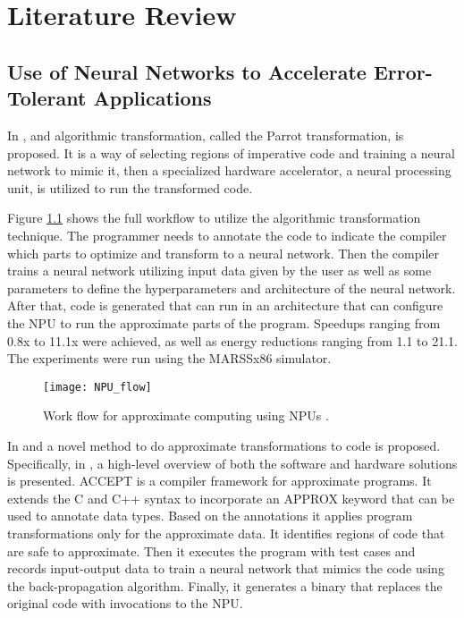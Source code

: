 \chapter{Literature Review}
\label{ch:review}

\section{Use of Neural Networks to Accelerate Error-\\Tolerant Applications}

In \cite{Esmaeilzadeh2012}, and algorithmic transformation, called the Parrot transformation, is proposed. It is a way of selecting regions of imperative code and training a neural network to mimic it, then a specialized hardware accelerator, a neural processing unit, is utilized to run the transformed code.

Figure \ref{fig:NPU_flow} shows the full workflow to utilize the algorithmic transformation technique. The programmer needs to annotate the code to indicate the compiler which parts to optimize and transform to a neural network. Then the compiler trains a neural network utilizing input data given by the user as well as some parameters to define the hyperparameters and architecture of the neural network. After that, code is generated that can run in an architecture that can configure the NPU to run the approximate parts of the program. Speedups ranging from 0.8x to 11.1x were achieved, as well as energy reductions ranging from 1.1 to 21.1. The experiments were run using the MARSSx86 simulator.

\begin{figure}[thbp]
	\centering
	\texttt{[image: NPU\_flow]}
	\caption{Work flow for approximate computing using NPUs \cite{Esmaeilzadeh2012}.}
	\label{fig:NPU_flow}
\end{figure}

In \cite{Moreau2015a} and \cite{Moreau2015} a novel method to do approximate transformations to code is proposed. Specifically, in \cite{Moreau2015a}, a high-level overview of both the software and hardware solutions is presented. ACCEPT is a compiler framework for approximate programs. It extends the C and C++ syntax to incorporate an APPROX keyword that can be used to annotate data types. Based on the annotations it applies program transformations only for the approximate data. It identifies regions of code that are safe to approximate. Then it executes the program with test cases and records input-output data to train a neural network that mimics the code using the back-propagation algorithm. Finally, it generates a binary that replaces the original code with invocations to the NPU.


